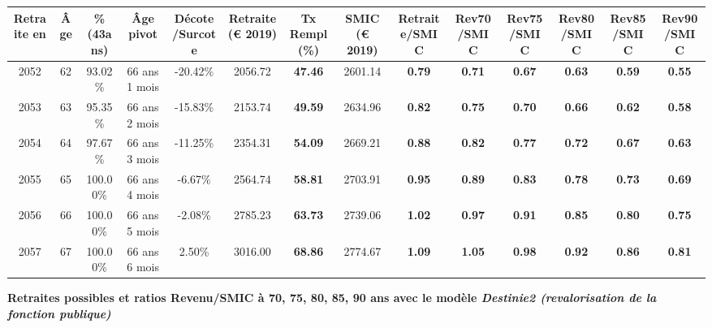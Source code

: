 \begin{adjustbox}{max width=\textwidth} 
\begin{tabular}[htb]{|c|c||c|c|c||c|c||c||c|c|c|c|c|c|} 
\hline 
 Retraite en &  Âge &  \%(43ans) &  Âge pivot &  Décote/Surcote &  Retraite (\euro{} 2019) &  Tx Rempl(\%) &  SMIC (\euro{} 2019) &  Retraite/SMIC &  Rev70/SMIC &  Rev75/SMIC &  Rev80/SMIC &  Rev85/SMIC &  Rev90/SMIC \\ 
\hline \hline 
 2052 &  62 &  93.02\% &  66 ans 1 mois &  -20.42\% &  2056.72 &  {\bf 47.46} &  2601.14 &  {\bf {\color{red} 0.79}} &  {\bf {\color{red} 0.71}} &  {\bf {\color{red} 0.67}} &  {\bf {\color{red} 0.63}} &  {\bf {\color{red} 0.59}} &  {\bf {\color{red} 0.55}} \\ 
\hline 
 2053 &  63 &  95.35\% &  66 ans 2 mois &  -15.83\% &  2153.74 &  {\bf 49.59} &  2634.96 &  {\bf {\color{red} 0.82}} &  {\bf {\color{red} 0.75}} &  {\bf {\color{red} 0.70}} &  {\bf {\color{red} 0.66}} &  {\bf {\color{red} 0.62}} &  {\bf {\color{red} 0.58}} \\ 
\hline 
 2054 &  64 &  97.67\% &  66 ans 3 mois &  -11.25\% &  2354.31 &  {\bf 54.09} &  2669.21 &  {\bf {\color{red} 0.88}} &  {\bf {\color{red} 0.82}} &  {\bf {\color{red} 0.77}} &  {\bf {\color{red} 0.72}} &  {\bf {\color{red} 0.67}} &  {\bf {\color{red} 0.63}} \\ 
\hline 
 2055 &  65 &  100.00\% &  66 ans 4 mois &  -6.67\% &  2564.74 &  {\bf 58.81} &  2703.91 &  {\bf {\color{red} 0.95}} &  {\bf {\color{red} 0.89}} &  {\bf {\color{red} 0.83}} &  {\bf {\color{red} 0.78}} &  {\bf {\color{red} 0.73}} &  {\bf {\color{red} 0.69}} \\ 
\hline 
 2056 &  66 &  100.00\% &  66 ans 5 mois &  -2.08\% &  2785.23 &  {\bf 63.73} &  2739.06 &  {\bf 1.02} &  {\bf {\color{red} 0.97}} &  {\bf {\color{red} 0.91}} &  {\bf {\color{red} 0.85}} &  {\bf {\color{red} 0.80}} &  {\bf {\color{red} 0.75}} \\ 
\hline 
 2057 &  67 &  100.00\% &  66 ans 6 mois &  2.50\% &  3016.00 &  {\bf 68.86} &  2774.67 &  {\bf 1.09} &  {\bf 1.05} &  {\bf {\color{red} 0.98}} &  {\bf {\color{red} 0.92}} &  {\bf {\color{red} 0.86}} &  {\bf {\color{red} 0.81}} \\ 
\hline 
\hline 
\end{tabular} 
\end{adjustbox} 
 
 \vspace{0.1cm} 
{\bf \noindent Retraites possibles et ratios Revenu/SMIC à 70, 75, 80, 85, 90 ans avec le modèle \emph{Destinie2 (revalorisation de la fonction publique)}}  
 
